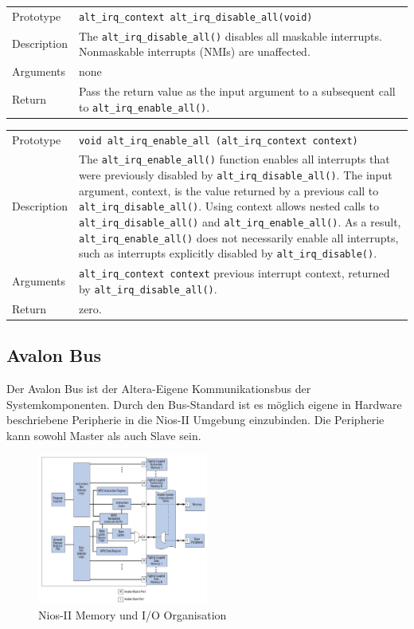 \begin{table}[h!]
\begin{tabular}[t]{p{} p{} }
Prototype & \lstinline$alt_irq_context alt_irq_disable_all(void)$ \\
Description & The \lstinline$alt_irq_disable_all()$ disables all maskable interrupts. Nonmaskable interrupts (NMIs) are unaffected.\\
Arguments & none \\
Return &  Pass the return value as the input argument to a subsequent call to \lstinline$alt_irq_enable_all()$.
\end{tabular}
\end{table}
\begin{table}[h!]
\begin{tabular}[t]{p{} p{} }
Prototype & \lstinline$void alt_irq_enable_all (alt_irq_context context)$ \\
Description & The \lstinline$alt_irq_enable_all()$ function enables all interrupts that were previously disabled by \lstinline$alt_irq_disable_all()$. The input argument, context, is the value returned by a previous call to \lstinline$alt_irq_disable_all()$. Using context allows nested calls to \lstinline$alt_irq_disable_all()$ and \lstinline$alt_irq_enable_all()$. As a result, \lstinline$alt_irq_enable_all()$ does not necessarily enable all interrupts, such as interrupts explicitly disabled by \lstinline$alt_irq_disable()$.\\
Arguments & \lstinline$alt_irq_context context$  previous interrupt context, returned by \lstinline$alt_irq_disable_all()$.\\
Return &  zero.
\end{tabular}
\end{table}
\newpage
\subsection{Avalon Bus}
Der Avalon Bus ist der Altera-Eigene Kommunikationsbus der Systemkomponenten. Durch den Bus-Standard ist es möglich eigene in Hardware beschriebene Peripherie in die Nios-II Umgebung einzubinden. Die Peripherie kann sowohl Master als auch Slave sein. 
\begin{figure}[h!]
\centering
\includegraphics[width=0.5\textwidth]{pic/NiosII_Memory_IO.png}
\caption{Nios-II Memory und I/O Organisation}
\end{figure}
